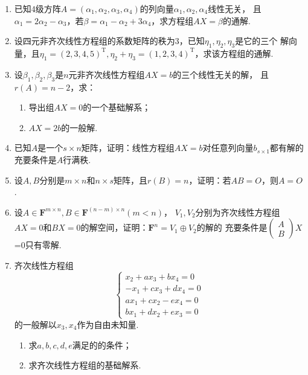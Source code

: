 \begin{enumerate}
    \item 已知4级方阵$A=(\alpha_1,\alpha_2,\alpha_3,\alpha_4)$的列向量$\alpha_1,\alpha_2,\alpha_4$线性无关，
    且$\alpha_1=2\alpha_2-\alpha_3$，若$\beta=\alpha_1-\alpha_2+3\alpha_4$，求方程组$AX=\beta$的通解.
    \item 设四元非齐次线性方程组的系数矩阵的秩为3，已知$\eta_1,\eta_2,\eta_3$是它的三个
    解向量，且$\eta_1=(2,3,4,5)^\mathrm{T},\eta_2+\eta_3=(1,2,3,4)^\mathrm{T}$，求该方程组的通解.
    \item 设$\beta_1,\beta_2,\beta_3$是$n$元非齐次线性方程组$AX=b$的三个线性无关的解，
    且$r(A)=n-2$，求：
    \begin{enumerate}[label=(\arabic*)]
        \item 导出组$AX=0$的一个基础解系；
        \item $AX=2b$的一般解.
    \end{enumerate}

    \item 已知$A$是一个$s\times n$矩阵，证明：线性方程组$AX=b$对任意列向量$b_{s\times 1}$都有解的充要条件是$A$行满秩.
    \item 设$A,B$分别是$m \times n$和$n \times s$矩阵，且$r(B)=n$，证明：若$AB=O$，则$A=O$.
    \item 设$A \in \mathbf{F}^{m \times n},B \in \mathbf{F}^{(n-m) \times n}(m<n)$，
	$V_1,V_2$分别为齐次线性方程组$AX=0$和$BX=0$的解空间，证明：$\mathbf{F}^n=V_1\oplus V_2$的解的
	充要条件是$\begin{pmatrix}
		A \\ B
	\end{pmatrix}X$=0只有零解.
	\item 齐次线性方程组
    \[\begin{cases}
		x_2+ax_3+bx_4=0 \\ -x_1+cx_3+dx_4=0 \\ ax_1+cx_2-ex_4=0 \\ bx_1+dx_2+ex_3=0
	\end{cases}\]
	的一般解以$x_3,x_4$作为自由未知量.
    \begin{enumerate}[label=(\arabic*)]
        \item 求$a,b,c,d,e$满足的的条件；
        \item 求齐次线性方程组的基础解系.
    \end{enumerate}
\end{enumerate}

